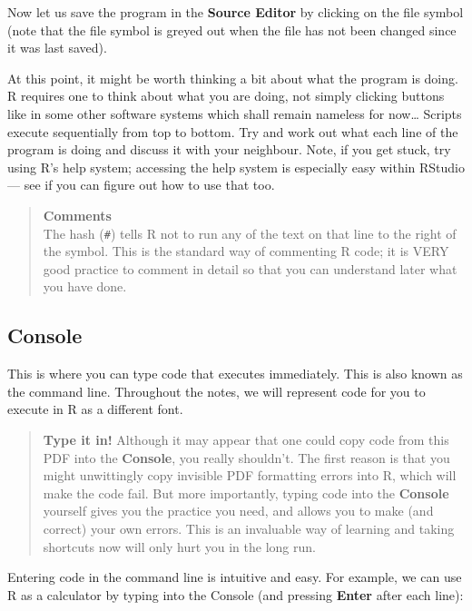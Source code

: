 \documentclass[
]{book}
\begin{document}
Now let us save the program in the \textbf{Source Editor} by clicking on the file symbol (note that the file symbol is greyed out when the file has not been changed since it was last saved).

At this point, it might be worth thinking a bit about what the program is doing. R requires one to think about what you are doing, not simply clicking buttons like in some other software systems which shall remain nameless for now\ldots{} Scripts execute sequentially from top to bottom. Try and work out what each line of the program is doing and discuss it with your neighbour. Note, if you get stuck, try using R's help system; accessing the help system is especially easy within RStudio --- see if you can figure out how to use that too.

\begin{quote}
\textbf{Comments}\\
The hash (\texttt{\#}) tells R not to run any of the text on that line to the right of the symbol. This is the standard way of commenting R code; it is VERY good practice to comment in detail so that you can understand later what you have done.
\end{quote}

\hypertarget{console}{%
\subsection{Console}\label{console}}

This is where you can type code that executes immediately. This is also known as the command line. Throughout the notes, we will represent code for you to execute in R as a different font.

\begin{quote}
\textbf{Type it in!}
Although it may appear that one could copy code from this PDF into the \textbf{Console}, you really shouldn't. The first reason is that you might unwittingly copy invisible PDF formatting errors into R, which will make the code fail. But more importantly, typing code into the \textbf{Console} yourself gives you the practice you need, and allows you to make (and correct) your own errors. This is an invaluable way of learning and taking shortcuts now will only hurt you in the long run.
\end{quote}

Entering code in the command line is intuitive and easy. For example, we can use R as a calculator by typing into the Console (and pressing \textbf{Enter} after each line):
\end{document}
